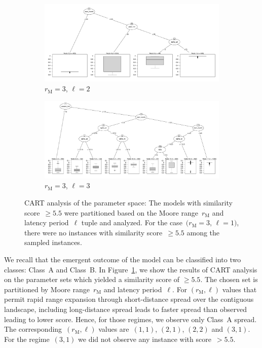\documentclass[10pt]{article}
\newcommand{\mooreRange}{r_\mathrm{M}}
\theoremstyle{definition}
\begin{document}
\begin{figure}[!ht]
\begin{subfigure}[b]{.45\textwidth}
    \end{subfigure}
    \begin{subfigure}[b]{.45\textwidth}
\includegraphics[width=\textwidth,trim={1cm 1cm 1cm 0cm},clip]{../cellular_automata/results/cart/m3_l2_tree.pdf}
\caption{$\mooreRange=3$, $\ell=2$}
    \end{subfigure}
    \begin{subfigure}[b]{.45\textwidth}
\includegraphics[width=\textwidth,trim={1cm 1cm 1cm 0cm},clip]{../cellular_automata/results/cart/m3_l3_tree.pdf}
\caption{$\mooreRange=3$, $\ell=3$}
    \end{subfigure}
    \caption{CART analysis of the parameter space: The models with
        similarity score~$\ge5.5$ were partitioned based on the Moore
    range~$\mooreRange$ and latency period~$\ell$ tuple and analyzed. For
 the case~$(\mooreRange=3$, $\ell=1)$, there were no instances with
 similarity score~$\ge5.5$ among the sampled instances. 
    \label{fig:cart}}
\end{figure}

We recall that the emergent outcome of the model can be classified into two
classes: Class~A and Class~B. In Figure~\ref{fig:cart}, we show the results
of CART analysis on the parameter sets which yielded a similarity score of
$\ge5.5$. The chosen set is partitioned by Moore range~$\mooreRange$ and
latency period~$\ell$. For $(\mooreRange,\ell)$ values that permit rapid
range expansion through short-distance spread over the contiguous
landscape, including long-distance spread leads to faster spread than
observed leading to lower score. Hence, for those regimes, we
observe only Class~A spread. The corresponding~$(\mooreRange,\ell)$ values
are~$(1,1)$, $(2,1)$, $(2,2)$ and $(3,1)$. For the regime~$(3,1)$ we did
not observe any instance with score~$>5.5$.
\end{document}
